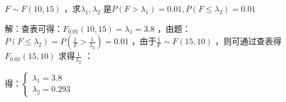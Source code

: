 \begin{eg}
    $F\sim F\left( 10,15 \right)$ ，求$\lambda_1,\lambda_2$ 是$P\left( F>\lambda_1 \right)=0.01,P\left( F\le\lambda_2 \right)=0.01$
\end{eg}
解：查表可得：$F_{0.01}\left( 10,15 \right)=\lambda_1=3.8$ ，由题：$P\left( F\le \lambda_2 \right)=P\left( \frac{1}{F}>\frac{1}{\lambda_2} \right)=0.01$ ，由于$\frac{1}{F}\sim F\left( 15,10 \right)$ ，则可通过查表得$F_{0.01}\left( 15,10 \right)$ 求得$\frac{1}{\lambda_2}$ ：

得：$\begin{cases}
    \lambda_1=3.8\\
    \lambda_2=0.293
\end{cases}$
